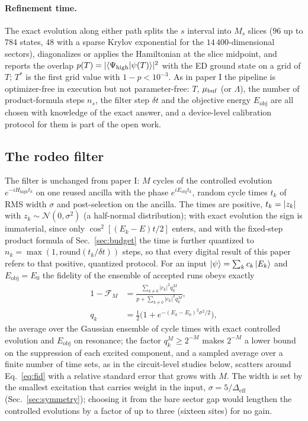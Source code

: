 \documentclass[a4paper,11pt,noarxiv]{quantumarticle}
\newcommand{\Hhigh}{H_{\mathrm{high}}}
\newcommand{\Eobj}{E_{\mathrm{obj}}}
\newcommand{\Deff}{\Delta_{\mathrm{eff}}}
\begin{document}
\paragraph{Refinement time.}
The exact evolution along either path splits the $s$ interval into $M_s$
slices ($96$ up to $784$ states, $48$ with a sparse Krylov exponential for
the $14\,400$-dimensional sectors), diagonalizes or applies the Hamiltonian
at the slice midpoint, and reports the overlap
$p(T)=|\langle\Psi_{\rm high}|\psi(T)\rangle|^2$ with the ED ground state on
a grid of $T$; $T^*$ is the first grid value with $1-p<10^{-3}$.  As in
paper I the pipeline is optimizer-free in execution but not parameter-free:
$T$, $\mu_{\rm buf}$ (or $\Lambda$), the number of product-formula steps
$n_s$, the filter step $\delta t$ and the objective energy $\Eobj$ are all
chosen with knowledge of the exact answer, and a device-level calibration
protocol for them is part of the open work.

\subsection{The rodeo filter}
\label{sec:rodeo}
The filter is unchanged from paper I: $M$ cycles of the controlled
evolution $e^{-i\Hhigh t_k}$ on one reused ancilla with the phase
$e^{i\Eobj t_k}$, random cycle times $t_k$ of RMS width $\sigma$ and
post-selection on the ancilla.  The times are positive, $t_k=\abs{z_k}$
with $z_k\sim\mathcal N(0,\sigma^2)$ (a half-normal distribution); with
exact evolution the sign is immaterial, since only $\cos^2[(E_k-E)t/2]$
enters, and with the fixed-step product formula of
Sec.~\ref{sec:budget} the time is further quantized to
$n_k=\max(1,\mathrm{round}(t_k/\delta t))$ steps, so that every digital
result of this paper refers to that positive, quantized protocol.  For an input $\ket\psi=\sum_kc_k\ket{E_k}$
and $\Eobj=E_0$ the fidelity of the ensemble of accepted runs obeys exactly
\begin{align}
  1-\mathcal F_M&=\frac{\sum_{k\neq0}|c_k|^2q_k^M}{p+\sum_{k\neq0}|c_k|^2q_k^M},\nonumber\\
  q_k&=\tfrac12\big(1+e^{-(E_k-E_0)^2\sigma^2/2}\big),
  \label{eq:fid}
\end{align}
the average over the Gaussian ensemble of cycle times with exact controlled
evolution and $\Eobj$ on resonance; the factor $q_k^M\ge2^{-M}$ makes
$2^{-M}$ a lower bound on the suppression of each excited component, and a
sampled average over a finite number of time sets, as in the circuit-level
studies below, scatters around Eq.~\eqref{eq:fid} with a relative standard
error that grows with $M$.  The width is set by the smallest excitation that
carries weight in the input, $\sigma=5/\Deff$ (Sec.~\ref{sec:symmetry});
choosing it from the bare sector gap would lengthen the controlled
evolutions by a factor of up to three (sixteen sites) for no gain.
\end{document}
